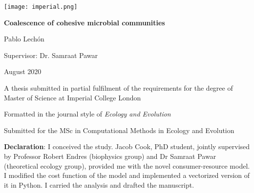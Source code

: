 \documentclass[titlepage,11pt]{article}
\newlength\longest\clearpage
\begin{document}
	\begin{titlepage}
		\texttt{[image: imperial.png]} 
		\vspace*{\fill}
		\begin{center}
			\hfill \break
			\hfill \break
			{\LARGE \textbf{Coalescence of cohesive microbial communities}}\par
			\hfill \break
			\hfill \break
			Pablo Lechón\par
			Supervisor: Dr. Samraat Pawar\par
			August 2020\par
		\end{center}
		\vspace*{\fill}
		
		\begin{center}
			A thesis submitted in partial fulfilment of the requirements for the degree of Master of Science at Imperial College London
			
			Formatted in the journal style of \textit{Ecology and Evolution}
			
			Submitted for the MSc in Computational Methods in Ecology and Evolution
		\end{center}
	\end{titlepage}

	
	\thispagestyle{empty}
	\textbf{Declaration}: I conceived the study. Jacob Cook, PhD student, jointly supervised by Professor Robert Endres (biophysics group) and Dr Samraat Pawar (theoretical ecology group), provided me with the novel consumer-resource model. I modified the cost function of the model and implemented a vectorized version of it in Python. I carried the analysis and drafted the manuscript. 
	\clearpage
	
	\thispagestyle{empty}
	\null\vfill
	
	\settowidth{}
	\begin{center}
	\parbox{\longest}{%
		\raggedright{%
			\par\bigskip
		}   
		\par%
	}
\end{center}
	\vfill\vfill
	
\end{document}
